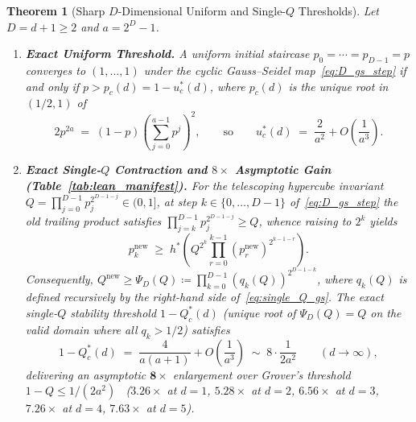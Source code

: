 \documentclass[11pt,a4paper]{article}
\newtheorem{theorem}{Theorem}[section]
\theoremstyle{definition}
\begin{document}
\begin{theorem}[Sharp $D$-Dimensional Uniform and Single-$Q$ Thresholds]
\label{thm:hypercube_Q}
Let $D = d+1 \ge 2$ and $a = 2^D - 1$.
\begin{enumerate}[label=(\alph*),leftmargin=2em,itemsep=2pt]
  \item \textbf{Exact Uniform Threshold.} A uniform initial staircase $p_0 = \cdots = p_{D-1} = p$ converges to $(1,\dots,1)$ under the cyclic Gauss--Seidel map~\eqref{eq:D_gs_step} if and only if $p > p_c(d) = 1 - u_c^*(d)$, where $p_c(d)$ is the unique root in $(1/2,1)$ of
  \begin{equation}
    2 p^{2a} \;=\; (1 - p)\left(\sum_{j=0}^{a-1} p^j\right)^2,
    \qquad\text{so}\qquad
    u_c^*(d) \;=\; \frac{2}{a^2} + O\!\left(\frac{1}{a^3}\right).
    \label{eq:poly_D}
  \end{equation}
  \item \textbf{Exact Single-$Q$ Contraction and $8\times$ Asymptotic Gain (Table~\ref{tab:lean_manifest}).} For the telescoping hypercube invariant $Q = \prod_{j=0}^{D-1} p_j^{2^{D-1-j}} \in (0,1]$, at step $k \in \{0,\dots,D-1\}$ of~\eqref{eq:D_gs_step} the old trailing product satisfies $\prod_{j=k}^{D-1} p_j^{2^{D-1-j}} \ge Q$, whence raising to $2^k$ yields
  \begin{equation}
    p_k^{\mathrm{new}} \;\ge\; h^*\!\left(Q^{2^k} \prod_{r=0}^{k-1} (p_r^{\mathrm{new}})^{2^{k-1-r}}\right).
    \label{eq:single_Q_gs}
  \end{equation}
  Consequently, $Q^{\mathrm{new}} \ge \Psi_D(Q) \coloneqq \prod_{k=0}^{D-1} (q_k(Q))^{2^{D-1-k}}$, where $q_k(Q)$ is defined recursively by the right-hand side of~\eqref{eq:single_Q_gs}. The exact single-$Q$ stability threshold $1 - Q_c^*(d)$ (unique root of $\Psi_D(Q) = Q$ on the valid domain where all $q_k > 1/2$) satisfies
  \begin{equation}
    1 - Q_c^*(d) \;=\; \frac{4}{a(a+1)} + O\!\left(\frac{1}{a^3}\right)
    \;\sim\; 8 \cdot \frac{1}{2a^2}
    \qquad (d \to \infty),
    \label{eq:single_Q_asymp}
  \end{equation}
  delivering an asymptotic $\mathbf{8\times}$ enlargement over Grover's threshold $1 - Q \le 1/(2a^2)$~\cite{Grover2026Extensions} ($3.26\times$ at $d=1$, $5.28\times$ at $d=2$, $6.56\times$ at $d=3$, $7.26\times$ at $d=4$, $7.63\times$ at $d=5$).
\end{enumerate}
\end{theorem}
\end{document}
